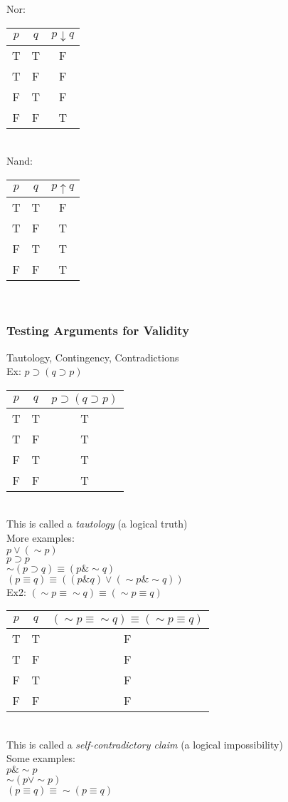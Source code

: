 Nor:\\
\begin{tabular}{c|c|c}
    $p$ & $q$ & $p\downarrow q$\\
    \hline
    T & T & F\\
    T & F & F\\
    F & T & F\\
    F & F & T
\end{tabular}\\

Nand:\\
\begin{tabular}{c|c|c}
    $p$ & $q$ & $p\uparrow q$\\
    \hline
    T & T & F\\
    T & F & T\\
    F & T & T\\
    F & F & T
\end{tabular}\\

\subsubsection{Testing Arguments for Validity}
Tautology, Contingency, Contradictions\\
Ex: $p\supset(q\supset p)$\\
\begin{tabular}{c|c|c}
    $p$ & $q$ & $p\supset(q\supset p)$\\
    \hline
    T & T & T\\
    T & F & T\\
    F & T & T\\
    F & F & T
\end{tabular}\\
This is called a \textit{tautology} (a logical truth)\\
More examples:\\
$p\vee(\sim p)$\\
$p\supset p$\\
$\sim(p\supset q)\equiv(p\&\sim q)$\\
$(p\equiv q)\equiv((p\&q)\vee(\sim p\&\sim q))$\\

Ex2: $(\sim p\equiv\sim q)\equiv(\sim p\equiv q)$\\
\begin{tabular}{c|c|c}
    $p$ & $q$ & $(\sim p\equiv\sim q)\equiv(\sim p\equiv q)$\\
    \hline
    T & T & F\\
    T & F & F\\
    F & T & F\\
    F & F & F
\end{tabular}\\
This is called a \textit{self-contradictory claim} (a logical impossibility)\\
Some examples:\\
$p\&\sim p$\\
$\sim(p\vee \sim p)$\\
$(p\equiv q)\equiv\sim(p\equiv q)$\\

